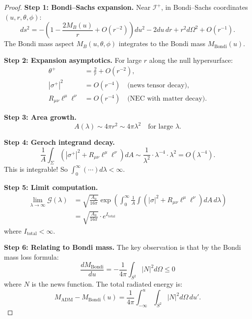 \begin{proof}
\textbf{Step 1: Bondi--Sachs expansion.}
Near $\mathscr{I}^+$, in Bondi--Sachs coordinates $(u, r, \theta, \phi)$:
\begin{equation}
    ds^2 = -\left(1 - \frac{2M_B(u)}{r} + O(r^{-2})\right)du^2 - 2du\,dr + r^2 d\Omega^2 + O(r^{-1}).
\end{equation}
The Bondi mass aspect $M_B(u, \theta, \phi)$ integrates to the Bondi mass $M_{\mathrm{Bondi}}(u)$.

\textbf{Step 2: Expansion asymptotics.}
For large $r$ along the null hypersurface:
\begin{align}
    \theta^+ &= \frac{2}{r} + O(r^{-2}), \\
    |\sigma^+|^2 &= O(r^{-4}) \quad \text{(news tensor decay)}, \\
    R_{\mu\nu}\ell^\mu\ell^\nu &= O(r^{-4}) \quad \text{(NEC with matter decay)}.
\end{align}

\textbf{Step 3: Area growth.}
\begin{equation}
    A(\lambda) \sim 4\pi r^2 \sim 4\pi \lambda^2 \quad \text{for large } \lambda.
\end{equation}

\textbf{Step 4: Geroch integrand decay.}
\begin{equation}
    \frac{1}{A}\int_\Sigma (|\sigma^+|^2 + R_{\mu\nu}\ell^\mu\ell^\nu) dA \sim \frac{1}{\lambda^2} \cdot \lambda^{-4} \cdot \lambda^2 = O(\lambda^{-4}).
\end{equation}
This is integrable! So $\int_0^\infty (\cdots) d\lambda < \infty$.

\textbf{Step 5: Limit computation.}
\begin{align}
    \lim_{\lambda \to \infty} \mathcal{G}(\lambda) &= \sqrt{\frac{A_0}{16\pi}} \exp\left(\int_0^\infty \frac{1}{A}\int(|\sigma|^2 + R_{\mu\nu}\ell^\mu\ell^\nu) dA \, d\lambda\right) \\
    &= \sqrt{\frac{A_0}{16\pi}} \cdot e^{I_{\text{total}}}
\end{align}
where $I_{\text{total}} < \infty$.

\textbf{Step 6: Relating to Bondi mass.}
The key observation is that by the Bondi mass loss formula:
\begin{equation}
    \frac{dM_{\mathrm{Bondi}}}{du} = -\frac{1}{4\pi}\int_{S^2} |N|^2 d\Omega \leq 0
\end{equation}
where $N$ is the news function. The total radiated energy is:
\begin{equation}
    M_{\mathrm{ADM}} - M_{\mathrm{Bondi}}(u) = \frac{1}{4\pi}\int_{-\infty}^u \int_{S^2} |N|^2 d\Omega \, du'.
\end{equation}


\end{proof}
